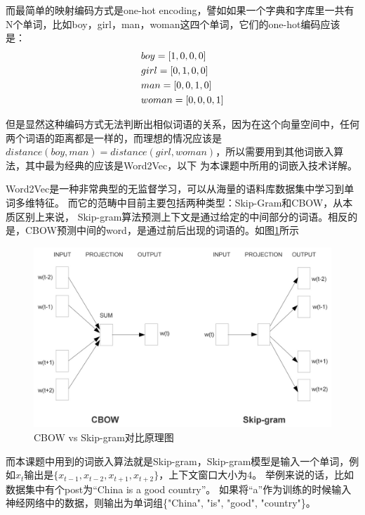 \documentclass[supercite]{HustGraduPaper}
\theoremstyle{definition}
\begin{document}
而最简单的映射编码方式是one-hot encoding，譬如如果一个字典和字库里一共有N个单词，比如boy，girl，man，woman这四个单词，它们的one-hot编码应该是：
\begin{align}
  &boy = [1,0,0,0]\notag\\
  &girl = [0,1,0,0]\notag\\
  &man = [0,0,1,0]\notag\\
  &woman = [0,0,0,1]\notag
\end{align}


但是显然这种编码方式无法判断出相似词语的关系，因为在这个向量空间中，任何两个词语的距离都是一样的，而理想的情况应该是
$distance(boy, man) = distance(girl, woman)$，所以需要用到其他词嵌入算法，其中最为经典的应该是Word2Vec，以下
为本课题中所用的词嵌入技术详解。

Word2Vec是一种非常典型的无监督学习，可以从海量的语料库数据集中学习到单词多维特征。
而它的范畴中目前主要包括两种类型：Skip-Gram\cite{guthrie2006closer}和CBOW，从本质区别上来说，
Skip-gram算法预测上下文是通过给定的中间部分的词语。相反的是，CBOW预测中间的word，是通过前后出现的词语的。如图\ref{Fig.word2vec}所示

\begin{figure}[htbp] %
  \centering %
  \includegraphics[width=1\textwidth]{images/word2vec.jpg} %
  \caption{CBOW vs Skip-gram对比原理图} %
  \label{Fig.word2vec} %
\end{figure}

而本课题中用到的词嵌入算法就是Skip-gram，Skip-gram模型是输入一个单词，例如$x_t$输出是$\{x_{t-1},x_{t-2},x_{t+1},x_{t+2}\}$，上下文窗口大小为4。
举例来说的话，比如数据集中有个post为“China is a good country”。
如果将“a”作为训练的时候输入神经网络中的数据，则输出为单词组\{"China", "is", "good", "country"\}。
\end{document}
